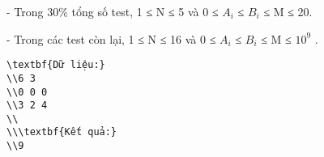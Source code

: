 - Trong 30\% tổng số test, 1 ≤ N ≤ 5 và 0 ≤ $A_{i}$   ≤ $B_{i}$   ≤ M ≤ 20.  

   - Trong các test còn lại, 1 ≤ N ≤ 16 và 0 ≤ $A_{i}$   ≤ $B_{i}$   ≤ M ≤ $10^{9}$   .
\begin{verbatim}
\textbf{Dữ liệu:}
\\6 3
\\0 0 0
\\3 2 4
\\
\\\textbf{Kết quả:}
\\9\end{verbatim}